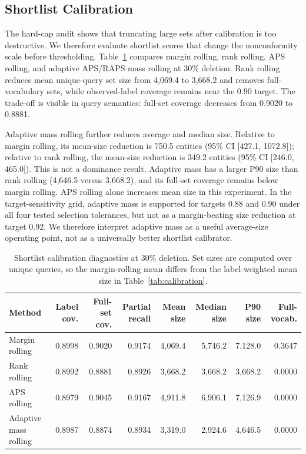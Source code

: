 \documentclass[10pt,twocolumn]{article}
\begin{document}
\subsection{Shortlist Calibration}

The hard-cap audit shows that truncating large sets after calibration is too
destructive. We therefore evaluate shortlist scores that change the
nonconformity scale before thresholding. Table~\ref{tab:shortlist} compares
margin rolling, rank rolling, APS rolling, and adaptive APS/RAPS mass rolling at
30\% deletion. Rank rolling reduces mean unique-query set size from 4,069.4 to
3,668.2 and removes full-vocabulary sets, while observed-label coverage remains
near the 0.90 target. The trade-off is visible in query semantics: full-set
coverage decreases from 0.9020 to 0.8881.

Adaptive mass rolling further reduces average and median size. Relative to
margin rolling, its mean-size reduction is 750.5 entities (95\% CI [427.1,
1072.8]); relative to rank rolling, the mean-size reduction is 349.2 entities
(95\% CI [246.0, 465.0]). This is not a dominance result. Adaptive mass has a
larger P90 size than rank rolling (4,646.5 versus 3,668.2), and its full-set
coverage remains below margin rolling. APS rolling alone increases mean size in
this experiment. In the target-sensitivity grid, adaptive mass is supported for
targets 0.88 and 0.90 under all four tested selection tolerances, but not as a
margin-beating size reduction at target 0.92. We therefore interpret adaptive
mass as a useful average-size operating point, not as a universally better
shortlist calibrator.

\begin{table}[t]
\centering
\caption{Shortlist calibration diagnostics at 30\% deletion. Set sizes are
computed over unique queries, so the margin-rolling mean differs from the
label-weighted mean size in Table~\ref{tab:calibration}.}
\label{tab:shortlist}
\footnotesize
\setlength{\tabcolsep}{4pt}
\begin{tabular}{lrrrrrrr}
\toprule
Method & Label cov. & Full-set cov. & Partial recall & Mean size & Median size & P90 size & Full-vocab.\\
\midrule
Margin rolling & 0.8998 & 0.9020 & 0.9174 & 4,069.4 & 5,746.2 & 7,128.0 & 0.3647\\
Rank rolling & 0.8992 & 0.8881 & 0.8926 & 3,668.2 & 3,668.2 & 3,668.2 & 0.0000\\
APS rolling & 0.8979 & 0.9045 & 0.9167 & 4,911.8 & 6,906.1 & 7,126.9 & 0.0000\\
Adaptive mass rolling & 0.8987 & 0.8874 & 0.8934 & 3,319.0 & 2,924.6 & 4,646.5 & 0.0000\\
\bottomrule
\end{tabular}
\end{table}
\end{document}
